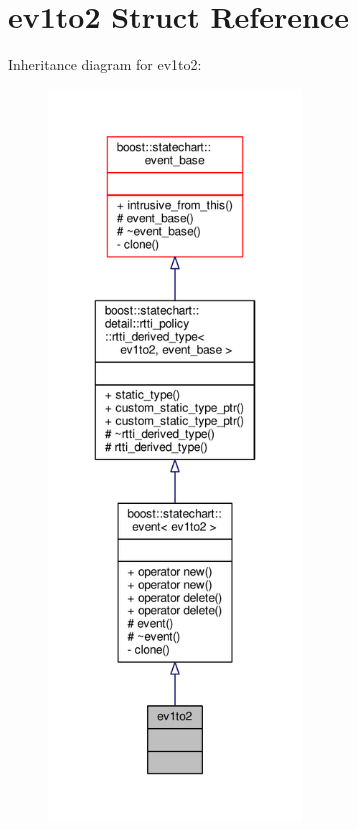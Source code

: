 \hypertarget{structev1to2}{}\section{ev1to2 Struct Reference}
\label{structev1to2}


Inheritance diagram for ev1to2\+:
\nopagebreak
\begin{figure}[H]
\begin{center}
\leavevmode
\includegraphics[height=550pt]{structev1to2__inherit__graph}
\end{center}
\end{figure}


